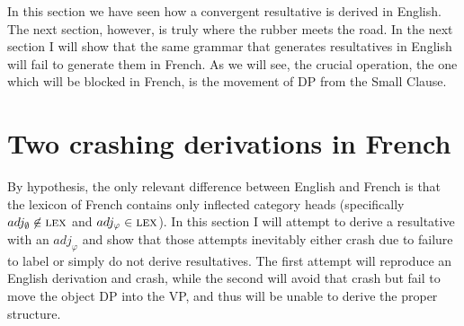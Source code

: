 \documentclass[MilwayThesis]{subfiles}
\begin{document}
In this section we have seen how a convergent resultative is derived in English.
The next section, however, is truly where the rubber meets the road.
In the next section I will show that the same grammar that generates resultatives in English will fail to generate them in French.
As we will see, the crucial operation, the one which will be blocked in French, is the movement of DP from the Small Clause.

\section{Two crashing derivations in French}
By hypothesis, the only relevant difference between English and French is that the lexicon of French contains only inflected category heads (specifically $adj_\emptyset \centernot\in \textsc{lex}$ and $adj_\varphi \in \textsc{lex}$).
In this section I will attempt to derive a resultative with an $adj_\varphi$ and show that those attempts inevitably either crash due to failure to label or simply do not derive resultatives.
The first attempt will reproduce an English derivation and crash, while the second will avoid that crash but fail to move the object DP into the VP, and thus will be unable to derive the proper structure.
\end{document}

